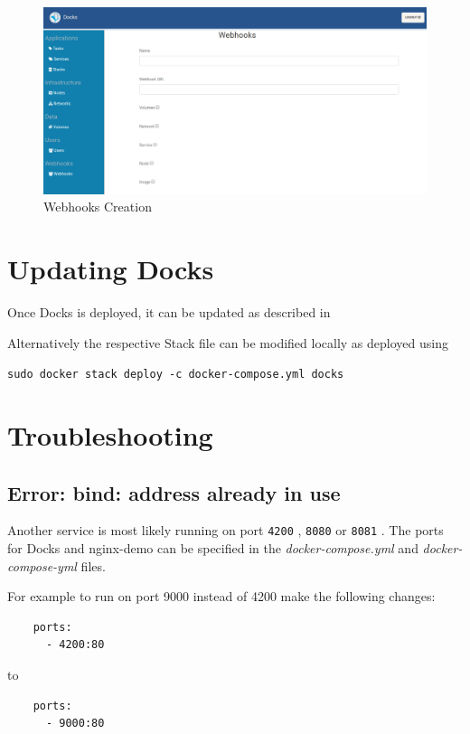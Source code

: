 \documentclass[]{article}
\let\oldtexttt\texttt
\renewcommand{\texttt}[1]{
	\colorbox{Light}{\oldtexttt{#1}}
}
\begin{document}
\begin{figure}[H]
	\centering
	\includegraphics[scale=0.4]{webhooks.png}
	\caption{Webhooks Creation}
\end{figure}

\section{Updating Docks}
Once Docks is deployed, it can be updated as described in 

Alternatively the respective Stack file can be modified locally as deployed using
\texttt{sudo docker stack deploy -c docker-compose.yml docks}

\section{Troubleshooting}
\subsection{Error: bind: address already in use}
Another service is most likely running on port \texttt{4200}, \texttt{8080} or \texttt{8081}.
The ports for Docks and nginx-demo can be specified in the \emph{docker-compose.yml} 
and \emph{docker-compose-yml} files.

For example to run on port 9000 instead of 4200 make the following changes:

\begin{lstlisting}
    ports:
      - 4200:80
\end{lstlisting}
to
\begin{lstlisting}
    ports:
      - 9000:80
\end{lstlisting}
\end{document}
